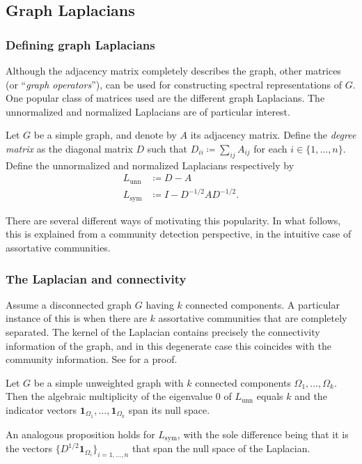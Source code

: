 \documentclass[../../main.tex]{subfiles} %
\begin{document}
\subsection{Graph Laplacians}  %
\subsubsection{Defining graph Laplacians}  %
Although the adjacency matrix completely describes the graph, other matrices 
(or ``\textit{graph operators}''), can be used for constructing spectral 
representations of \(G\). One popular class of matrices used are the different 
graph Laplacians. The unnormalized and normalized Laplacians are of particular 
interest.
\begin{definition}
	Let \(G\) be a simple graph, and denote by \(A\) its adjacency matrix. Define 
	the \textit{degree matrix} as the diagonal matrix \(D\) such that \(D_{ii} 
	\coloneqq \sum_{ij} A_{ij}\) for each \(i \in \{1, \dots, n\}\). Define the 
	unnormalized and normalized Laplacians respectively by
	\begin{equation}
		\begin{aligned}
			L_{\text{unn}} &\coloneqq D - A \\
			L_{\text{sym}} &\coloneqq I - D^{-1/2} A D^{-1/2}.
		\end{aligned}
	\label{def:laplacian-matrices}
	\end{equation}
\end{definition}
There are several different ways of motivating this popularity. In what follows, 
this is explained from a community detection perspective, in the intuitive case 
of assortative communities. 

\subsubsection{The Laplacian and connectivity}  %
Assume a disconnected graph \(G\) having \(k\) connected components. A 
particular instance of this is when there are \(k\) assortative communities that 
are completely separated. The kernel of the Laplacian contains precisely the 
connectivity information of the graph, and in this degenerate case this 
coincides with the community information. See 
\cite{von_luxburg_tutorial_2007} for a proof.
\begin{proposition}
	Let \(G\) be a simple unweighted graph with \(k\) connected components 
	\(\Omega_1, \dots, \Omega_k\). Then the algebraic multiplicity of the 
	eigenvalue \(0\) of \(L_{\text{unn}}\) equals \(k\) and the indicator vectors 
	\(\mathbf{1}_{\Omega_1}, \dots, \mathbf{1}_{\Omega_k}\) span its null 
	space.
\end{proposition}
\begin{remark}
An analogous proposition holds for \(L_{\text{sym}}\), with the sole difference 
being that it is the vectors \(\{D^{1/2} \mathbf{1}_{\Omega_i}\}_{i = 1, \dots, 
n}\) that span the null space of the Laplacian.
\end{remark}
\end{document}
